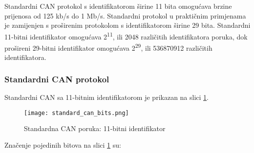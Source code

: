 Standardni CAN protokol s identifikatorom širine 11 bita omogućava brzine prijenosa od 125 kb/s do 1 Mb/s. Standardni protokol u praktičnim primjenama je zamijenjen s proširenim protokolom s identifikatorom širine 29 bita. Standardni 11-bitni identifikator omogućava 2\textsuperscript{11}, ili 2048 različitih identifikatora poruka, dok prošireni 29-bitni identifikator omogućava 2\textsuperscript{29}, ili 536870912 različitih identifikatora. 

\subsubsection{Standardni CAN protokol}

Standardni CAN sa 11-bitnim identifikatorom je prikazan na slici \ref{fig:standard_can_bits}.
\begin{figure}[H]
	\centering
	\texttt{[image: standard\_can\_bits.png]}
	\caption{Standardna CAN poruka: 11-bitni identifikator \cite[str. 3]{can_manual}}
	\label{fig:standard_can_bits}
\end{figure}
Značenje pojedinih bitova na slici \ref{fig:standard_can_bits} su:
